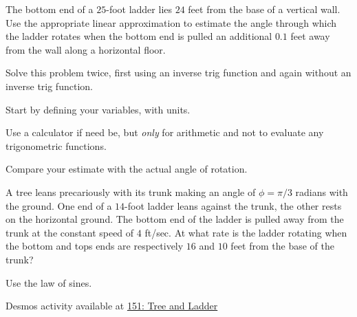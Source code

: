 \documentclass{ximera}
\begin{document}
\begin{question}  \label{Q:3e4fg45534}
The bottom end of a $25$-foot ladder lies $24$ feet from the base of a vertical wall. Use the appropriate linear approximation to estimate the angle through which the ladder rotates when the bottom end is pulled an additional $0.1$ feet away from the wall along a horizontal floor. 

Solve this problem twice, first using an inverse trig function and again without an inverse trig function. 

Start by defining your variables, with units.

Use a calculator if need be, but \emph{only} for arithmetic and not to evaluate any trigonometric functions.

Compare your estimate with the actual angle of rotation.

\end{question}

\begin{question}  \label{Qdsfgnbn444}
A tree leans precariously with its trunk making an angle of $\phi = \pi/3$ radians with the ground. One end of a $14$-foot ladder leans against the trunk, the other rests on the horizontal ground. The bottom end of the ladder is pulled away from the trunk at the constant speed of $4$ ft/sec. At what rate is the ladder rotating when the bottom and tops ends are respectively $16$ and $10$ feet from the base of the trunk?

\begin{hint}
Use the law of sines.
\end{hint}

\begin{onlineOnly}
    \begin{center}
\end{center}
\end{onlineOnly}

Desmos activity available at \href{https://www.desmos.com/calculator/rpms2jqfpm}{151: Tree and Ladder}

\end{question}
\end{document}

